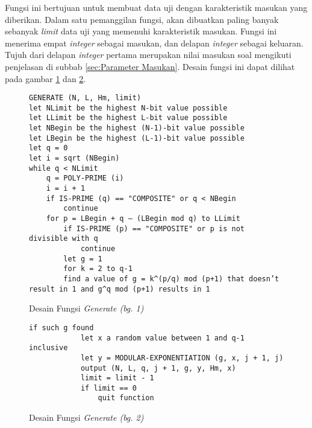 Fungsi ini bertujuan untuk membuat data uji dengan karakteristik masukan yang diberikan. Dalam satu pemanggilan fungsi, akan dibuatkan paling banyak sebanyak \textit{limit} data uji yang memenuhi karakteristik masukan. Fungsi ini menerima empat \textit{integer} sebagai masukan, dan delapan \textit{integer} sebagai keluaran. Tujuh dari delapan \textit{integer} pertama merupakan nilai masukan soal mengikuti penjelasan di subbab \ref{sec:Parameter Masukan}. Desain fungsi ini dapat dilihat pada gambar \ref{psdo:generate_1} dan \ref{psdo:generate_2}.
\begin{figure}[h!]
\begin{lstlisting}[firstnumber=0]
GENERATE (N, L, Hm, limit)
let NLimit be the highest N-bit value possible
let LLimit be the highest L-bit value possible
let NBegin be the highest (N-1)-bit value possible
let LBegin be the highest (L-1)-bit value possible
let q = 0
let i = sqrt (NBegin)
while q < NLimit
	q = POLY-PRIME (i)
	i = i + 1
	if IS-PRIME (q) == "COMPOSITE" or q < NBegin
		continue
	for p = LBegin + q – (LBegin mod q) to LLimit
		if IS-PRIME (p) == "COMPOSITE" or p is not divisible with q
			continue
		let g = 1
		for k = 2 to q-1
		find a value of g = k^(p/q) mod (p+1) that doesn’t result in 1 and g^q mod (p+1) results in 1
\end{lstlisting}
\caption{Desain Fungsi \textit{Generate (bg. 1)}}
\label{psdo:generate_1}
\end{figure}

\begin{figure}[t!]
\begin{lstlisting}[firstnumber=last]
		if such g found
			let x a random value between 1 and q-1 inclusive
			let y = MODULAR-EXPONENTIATION (g, x, j + 1, j)
			output (N, L, q, j + 1, g, y, Hm, x)
			limit = limit - 1
			if limit == 0
				quit function
\end{lstlisting}
\caption{Desain Fungsi \textit{Generate (bg. 2)}}
\label{psdo:generate_2}
\end{figure}